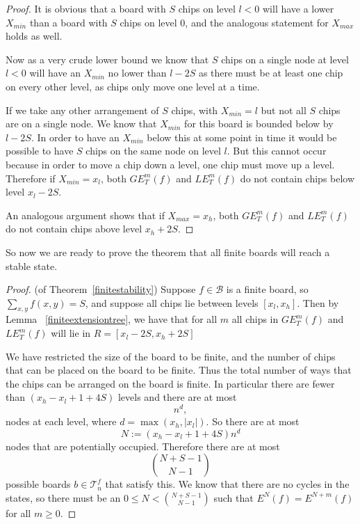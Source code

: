 \documentclass[runningheads,a4paper]{llncs}
\begin{document}
\begin{proof}
It is obvious that a board with $S$ chips on level $l<0$ will have a lower $X_{min}$ than a board with $S$ chips on level 0, and the analogous statement for $X_{max}$ holds as well. 

Now as a very crude lower bound we know that $S$ chips on a single node at level $l<0$ will have an $X_{min}$ no lower than $l-2S$ as there must be at least one chip on every other level, as chips only move one level at a time. 

If we take any other arrangement of $S$ chips, with $X_{min}=l$ but not all $S$ chips are on a single node. We know that $X_{min}$ for this board is bounded below by $l-2S$. In order to have an $X_{min}$ below this at some point in time it would be possible to have $S$ chips on the same node on level $l$. But this cannot occur because in order to move a chip down a level, one chip must move up a level. Therefore if $X_{min}=x_l$, both $GE_T^m(f)$ and $LE_T^m(f)$ do not contain chips below level $x_l -2S$.

An analogous argument shows that if $X_{max}=x_h$, both $GE_T^m(f)$ and $LE_T^m(f)$ do not contain chips above level $x_h+2S$.
\end{proof}

So now we are ready to prove the theorem that all finite boards will reach a stable state. 

\begin{proof}
(of Theorem~\ref{finitestability}) Suppose $f \in \mathcal{B}$ is a finite board, so $\sum_{x,y} f(x,y) = S$, and suppose all chips lie between levels  $[x_l, x_h]$. Then by Lemma ~\ref{finiteextensiontree}, we have that for all $m$ all chips in $GE_T^m(f)$ and $LE_T^m(f)$ will lie in $R = [x_l - 2S, x_h + 2S]$

We have restricted the size of the board to be finite, and the number of chips that can be placed on the board to be finite. 
Thus the total number of ways that the chips can be arranged on the board is finite. 
In particular there are fewer than $(x_h - x_l+1 + 4 S)$ levels and there are at most 
\begin{equation}
n^d,
\end{equation}
nodes at each level, where $d= \max(x_h, |x_l|)$. So there are at most 
\begin{equation}
N:=(x_h - x_l+1 + 4 S)n^d
\end{equation}
nodes that are potentially occupied. Therefore there are at most 
\begin{equation}
\binom{N+S-1}{N-1}
\end{equation}
possible boards $b \in \mathcal{T}_n^f$ that satisfy this. We know that there are no cycles in the states, so there must be an $0 \leq N < \binom{N+S-1}{N-1}$ such that $E^N(f) = E^{N+m}(f)$ for all $m \geq 0$.
\end{proof}
\end{document}
